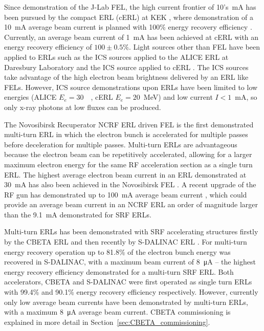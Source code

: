 \documentclass[../main.tex]{subfiles}
\begin{document}
Since demonstration of the J-Lab FEL, the high current frontier of 10's~\si{\milli\ampere} has been pursued by the compact ERL (cERL) at KEK \cite{akagi2016narrow}, where demonstration of a 10~\si{\milli\ampere} average beam current is planned with 100\% energy recovery efficiency \cite{adolphsen2022european}. Currently, an average beam current of 1~\si{\milli\ampere} has been achieved at cERL \cite{obina20191} with an energy recovery efficiency of $100\pm 0.5$\%. Light sources other than FEL have been applied to ERLs such as the 
ICS sources applied to the ALICE ERL at Daresbury Laboratory \cite{priebe2008inverse,priebe2010first} and the ICS source applied to cERL \cite{akagi2016narrow}. The ICS sources take advantage of the high electron beam brightness delivered by an ERL like FELs. However, ICS source demonstrations upon ERLs have been limited to low energies (ALICE $E_{e}=30$~\si{\mega\electonvolt}, cERL  $E_{e}=20$~\si{\mega\electronvolt}) and low current $I < 1$~\si{\milli\ampere}, so only x-ray photons at low fluxes can be produced. 

The Novosibirsk Recuperator NCRF ERL driven FEL is the first demonstrated multi-turn ERL \cite{gavrilov2007status} in which the electron bunch is accelerated for multiple passes before deceleration for multiple passes.  Multi-turn ERLs are advantageous because the electron beam can be repetitively accelerated, allowing for a larger maximum electron energy for the same RF acceleration section as a single turn ERL. The highest average electron beam current in an ERL demonstrated at 30~\si{\milli\ampere} has also been achieved in the Novosibirsk FEL \cite{gavrilov2007status}. A recent upgrade of the RF gun has demonstrated up to 100~\si{\milli\ampere} average beam current \cite{matveev2020simulation}, which could provide an average beam current in an NCRF ERL an order of magnitude larger than the 9.1~\si{\milli\ampere} \cite{neil2006jlab} demonstrated for SRF ERLs.  

Multi-turn ERLs has been demonstrated with SRF accelerating structures firstly by the CBETA ERL \cite{bartnik2020cbeta} and then recently by S-DALINAC ERL \cite{adolphsen2022european}. For multi-turn energy recovery operation up to 81.8\% of the electron bunch energy was recovered in S-DALINAC, with a maximum beam current of 8~\si{\micro\ampere} -- the highest energy recovery efficiency demonstrated for a multi-turn SRF ERL. Both accelerators, CBETA \cite{gulliford2021measurement} and S-DALINAC
\cite{steinhorst2021rf} were first operated as single turn ERLs with 99.4\% and 90.1\% energy recovery efficiency respectively. However, currently only low average beam currents have been demonstrated by multi-turn ERLs, with a maximum 8~\si{\micro\ampere} average beam current. CBETA commissioning is explained in more detail in Section~\ref{sec:CBETA_commissioning}.
\end{document}
